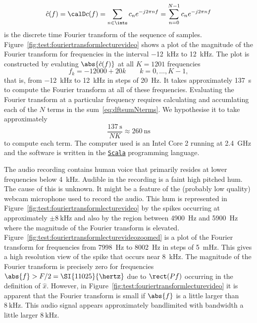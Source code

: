\begin{test}
\begin{equation}
\hat{c}(f) = \calD c(f) = \sum_{n \in \ints} c_n e^{-j 2\pi n f}  = \sum_{n = 0}^{N-1} c_n e^{-j 2\pi n f}
\end{equation}
is the discrete time Fourier transform of the sequence of samples.  Figure~\ref{fig:test:fouriertransformlecturevideo} shows a plot of the magnitude of the Fourier transform for frequencies in the interval \SI{-12}{\kilo\hertz} to \SI{12}{\kilo\hertz}.  The plot is constructed by evaluting $\abs{\hat{c}(f)}$ at all $K = 1201$ frequencies
\[
f_k = -12000 + 20k \qquad k = 0, \dots, K-1,
\]
that is, from \SI{-12}{\kilo\hertz} to \SI{12}{\kilo\hertz} in steps of \SI{20}{\hertz}.  It takes approximately \SI{137}{\second} to compute the Fourier transform at all of these frequencies.  Evaluating the Fourier transform at a particular frequency requires calculating and accumlating each of the $N$ terms in the sum~\eqref{eq:dftsumNterms}.  We hypothesise it to take approximately
\[
\frac{\SI{137}{\second}}{NK} \approx \SI{260}{\nano\second}
\]
to compute each term.   The computer used is an Intel Core 2 running at \SI{2.4}{\giga\hertz} and the software is written in the \href{http://scala-lang.org/}{\texttt{Scala}} programming language.

The audio recording contains human voice that primarily resides at lower frequencies below \SI{4}{\kilo\hertz}.  Audible in the recording is a faint high pitched hum.  The cause of this is unknown.  It might be a feature of the (probably low quality) webcam microphone used to record the audio.  This hum is represented in Figure~\ref{fig:test:fouriertransformlecturevideo} by the spikes occurring at approximately $\pm\SI{8}{\kilo\hertz}$ and also by the region between \SI{4900}{\hertz} and \SI{5900}{\hertz} where the magnitude of the Fourier transform is elevated.  Figure~\ref{fig:test:fouriertransformlecturevideozoomed} is a plot of the Fourier transform for frequencies from \SI{7998}{\hertz} to \SI{8002}{\hertz} in steps of \SI{5}{\milli\hertz}.  This gives a high resolution view of the spike that occurs near \SI{8}{\kilo\hertz}.  The magnitude of the Fourier transform is precisely zero for frequencies $\abs{f} > F/2 = \SI{11025}{\hertz}$ due to $\rect(Pf)$ occurring in the definition of $\hat{x}$.  However, in Figure~\ref{fig:test:fouriertransformlecturevideo} it is apparent that the Fourier transform is small if $\abs{f}$ is a little larger than $\SI{8}{\kilo\hertz}$.  This audio signal appears approximately bandlimited with bandwidth a little larger $\SI{8}{\kilo\hertz}$.


\end{test}
